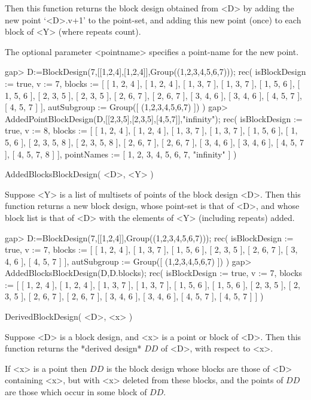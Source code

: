 Then this function returns the block design obtained from <D> by adding
the new point `<D>.v+1' to the point-set, and adding this new point
(once) to each block of <Y> (where repeats count).

The optional parameter <pointname> specifies a point-name for the
new point.

\beginexample
gap> D:=BlockDesign(7,[[1,2,4],[1,2,4]],Group((1,2,3,4,5,6,7)));
rec( isBlockDesign := true, v := 7, 
  blocks := [ [ 1, 2, 4 ], [ 1, 2, 4 ], [ 1, 3, 7 ], [ 1, 3, 7 ], 
      [ 1, 5, 6 ], [ 1, 5, 6 ], [ 2, 3, 5 ], [ 2, 3, 5 ], [ 2, 6, 7 ], 
      [ 2, 6, 7 ], [ 3, 4, 6 ], [ 3, 4, 6 ], [ 4, 5, 7 ], [ 4, 5, 7 ] ], 
  autSubgroup := Group([ (1,2,3,4,5,6,7) ]) )
gap> AddedPointBlockDesign(D,[[2,3,5],[2,3,5],[4,5,7]],"infinity");
rec( isBlockDesign := true, v := 8, 
  blocks := [ [ 1, 2, 4 ], [ 1, 2, 4 ], [ 1, 3, 7 ], [ 1, 3, 7 ], 
      [ 1, 5, 6 ], [ 1, 5, 6 ], [ 2, 3, 5, 8 ], [ 2, 3, 5, 8 ], [ 2, 6, 7 ], 
      [ 2, 6, 7 ], [ 3, 4, 6 ], [ 3, 4, 6 ], [ 4, 5, 7 ], [ 4, 5, 7, 8 ] ], 
  pointNames := [ 1, 2, 3, 4, 5, 6, 7, "infinity" ] )
\endexample



\>AddedBlocksBlockDesign( <D>, <Y> )

Suppose <Y> is a list of multisets of points of the block design <D>.
Then this function returns a new block design, whose point-set is that
of <D>, and whose block list is that of <D> with the elements of <Y>
(including repeats) added.

\beginexample
gap> D:=BlockDesign(7,[[1,2,4]],Group((1,2,3,4,5,6,7)));           
rec( isBlockDesign := true, v := 7, 
  blocks := [ [ 1, 2, 4 ], [ 1, 3, 7 ], [ 1, 5, 6 ], [ 2, 3, 5 ], 
      [ 2, 6, 7 ], [ 3, 4, 6 ], [ 4, 5, 7 ] ], 
  autSubgroup := Group([ (1,2,3,4,5,6,7) ]) )
gap> AddedBlocksBlockDesign(D,D.blocks);
rec( isBlockDesign := true, v := 7, 
  blocks := [ [ 1, 2, 4 ], [ 1, 2, 4 ], [ 1, 3, 7 ], [ 1, 3, 7 ], 
      [ 1, 5, 6 ], [ 1, 5, 6 ], [ 2, 3, 5 ], [ 2, 3, 5 ], [ 2, 6, 7 ], 
      [ 2, 6, 7 ], [ 3, 4, 6 ], [ 3, 4, 6 ], [ 4, 5, 7 ], [ 4, 5, 7 ] ] )
\endexample



\>DerivedBlockDesign( <D>, <x> )

Suppose <D> is a block design, and <x> is a point or block of <D>.
Then this function returns the *derived design*
$DD$ of <D>, with respect to <x>.

If <x> is a point then $DD$ is the block design whose blocks are those
of <D> containing <x>, but with <x> deleted from these blocks, and the
points of $DD$ are those which occur in some block of $DD$.

